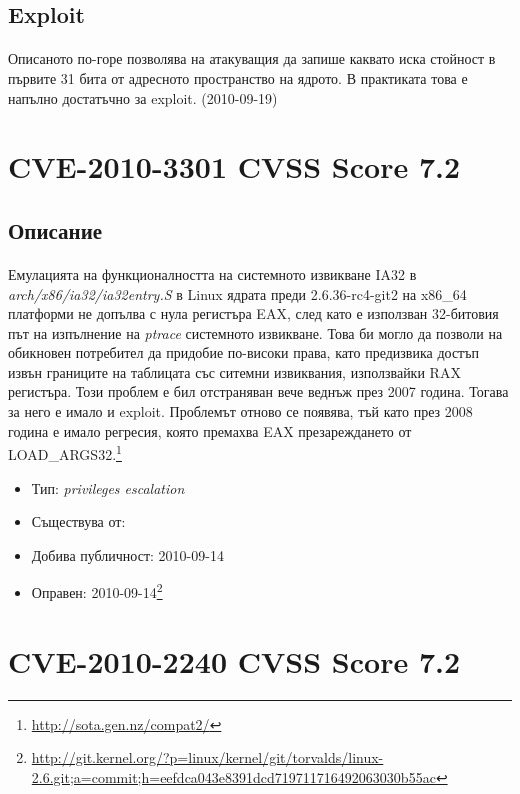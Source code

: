 \documentclass[a4paper,12pt,leqno]{article}
\begin{document}
\subsection{Exploit}
\paragraph{}
Описаното по-горе позволява на атакуващия да запише каквато иска стойност в първите 31 бита от адресното пространство на ядрото. В практиката това е напълно достатъчно за exploit. (2010-09-19)

\section{CVE-2010-3301 CVSS Score 7.2}
\subsection{Описание}
\paragraph{}
Емулацията на функционалността на системното извикване IA32 в\\ \textit{arch/x86/ia32/ia32entry.S} в Linux ядрата преди 2.6.36-rc4-git2 на x86\_64 платформи не допълва с нула регистъра EAX, след като е използван 32-битовия път на изпълнение на \textit{ptrace} системното извикване. Това би могло да позволи на обикновен потребител да придобие по-високи права, като предизвика достъп извън границите на таблицата със ситемни извиквания, използвайки RAX регистъра. Този проблем е бил отстраняван вече веднъж през 2007 година. Тогава за него е имало и exploit. Проблемът отново се появява, тъй като през 2008 година е имало регресия, която премахва EAX презареждането от LOAD\_ARGS32.\footnote{\url{http://sota.gen.nz/compat2/}}

\begin{itemize}
    \item Тип: \textit{privileges escalation}
    \item Съществува от:
  	\item Добива публичност: 2010-09-14
    \item Оправен: 2010-09-14\footnote{\url{http://git.kernel.org/?p=linux/kernel/git/torvalds/linux-2.6.git;a=commit;h=eefdca043e8391dcd719711716492063030b55ac}}
\end{itemize}

\section{CVE-2010-2240 CVSS Score 7.2}
\end{document}
